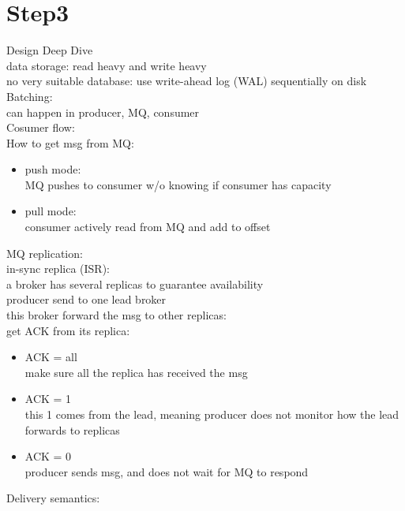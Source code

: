 \documentclass{article}
\begin{document}
\section{Step3}
Design Deep Dive\\
data storage:
read heavy and write heavy\\
no very suitable database: use write-ahead log (WAL) sequentially on disk\\
Batching:\\
can happen in producer, MQ, consumer\\
Cosumer flow:\\
How to get msg from MQ:\\
\begin{itemize}
    \item push mode:\\
    MQ pushes to consumer w/o knowing if consumer has capacity
    \item pull mode:\\
    consumer actively read from MQ and add to offset
\end{itemize}
MQ replication:\\
in-sync replica (ISR):\\
a broker has several replicas to guarantee availability\\
producer send to one lead broker\\
this broker forward the msg to other replicas:\\
get ACK from its replica:\\
\begin{itemize}
    \item ACK = all\\
    make sure all the replica has received the msg
    \item ACK = 1\\
    this 1 comes from the lead, meaning producer does not monitor how the lead forwards to replicas
    \item ACK = 0\\
    producer sends msg, and does not wait for MQ to respond
\end{itemize}
Delivery semantics:\\
\end{document}
